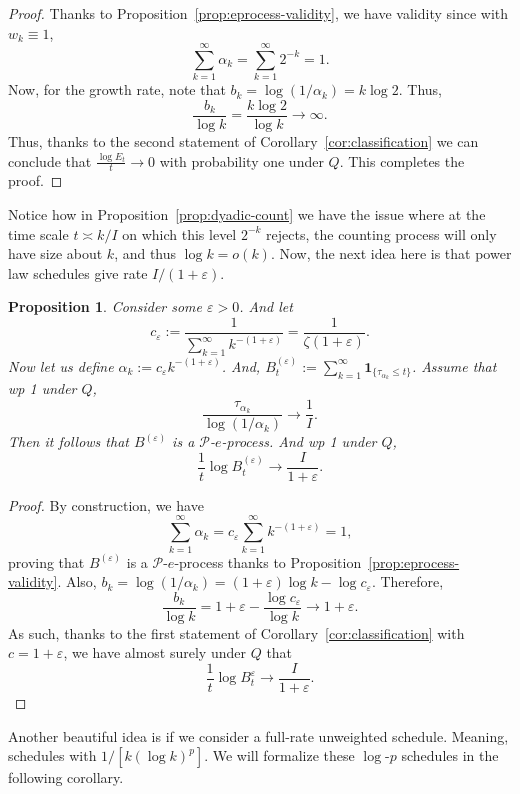 \documentclass{article}
\newcommand{\PP}{\mathcal P}
\newcommand{\ind}[1]{\mathbf{1}_{\{#1\}}}
\newtheorem{proposition}[theorem]{Proposition}
\theoremstyle{definition}
\begin{document}
\begin{proof}
Thanks to Proposition~\ref{prop:eprocess-validity}, we have validity since with $w_k\equiv 1$,
\[
\sum_{k=1}^{\infty}\alpha_k=\sum_{k=1}^{\infty}2^{-k}=1.
\]
Now, for the growth rate, note that $b_k=\log(1/\alpha_k)=k\log 2$. Thus,
\[
\frac{b_k}{\log k}=\frac{k\log 2}{\log k}\to\infty.
\]
Thus, thanks to the second statement of Corollary~\ref{cor:classification} we can conclude that $\frac{\log E_t}{t}\to 0$ with probability one under $Q$. This completes the proof.
\end{proof}

Notice how in Proposition~\ref{prop:dyadic-count} we have the issue where at the time scale $t\asymp k/I$ on which this level $2^{-k}$ rejects, the counting process will only have size about $k$, and thus $\log k = o(k)$. Now, the next idea here is that power law schedules give rate $I/(1+\varepsilon)$.

\begin{proposition}\label{prop:power-law}
Consider some $\varepsilon>0$. And let
\[
c_\varepsilon:=\frac{1}{\sum_{k=1}^\infty k^{-(1+\varepsilon)}}=\frac{1}{\zeta(1+\varepsilon)}.
\]
Now let us define $\alpha_k:=c_\varepsilon k^{-(1+\varepsilon)}$. And, $B_t^{(\varepsilon)}:=\sum_{k=1}^\infty\ind{\tau_{\alpha_k}\le t}$. Assume that wp 1 under $Q$,
\[
\frac{\tau_{\alpha_k}}{\log(1/\alpha_k)} \longrightarrow \frac{1}{I}.
\]
Then it follows that $B^{(\varepsilon)}$ is a $\mathcal P$-$e$-process. And wp 1 under $Q$,
\[
\frac{1}{t}\log B_t^{(\varepsilon)}\longrightarrow \frac{I}{1+\varepsilon}.
\]
\end{proposition}

\begin{proof}
By construction, we have
\[
\sum_{k=1}^{\infty}\alpha_k = c_{\varepsilon}\sum_{k=1}^{\infty}k^{-(1+\varepsilon)}=1,
\]
proving that $B^{(\varepsilon)}$ is a $\PP$-$e$-process thanks to Proposition~\ref{prop:eprocess-validity}. Also, $b_k=\log(1/\alpha_k)=(1+\varepsilon)\log k-\log c_{\varepsilon}$. Therefore,
\[
\frac{b_k}{\log k}=1+\varepsilon-\frac{\log c_{\varepsilon}}{\log k}\longrightarrow 1+\varepsilon.
\]
As such, thanks to the first statement of Corollary~\ref{cor:classification} with $c=1+\varepsilon$, we have almost surely under $Q$ that
\[
\frac{1}{t}\log B_t^{\varepsilon}\longrightarrow\frac{I}{1+\varepsilon}.
\]
\end{proof}

Another beautiful idea is if we consider a full-rate unweighted schedule. Meaning, schedules with $1/[k(\log k)^p]$. We will formalize these $\log$-$p$ schedules in the following corollary.
\end{document}

